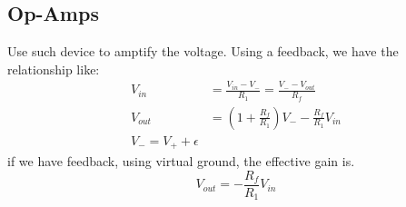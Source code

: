 \documentclass{article}
\begin{document}
\subsection{Op-Amps}
Use such device to amptify the voltage.
Using a feedback, we have the relationship like:
\begin{align*}
    V_{in} &= \frac{V_{in} - V_{-}}{R_1} = \frac{ V_{-} - V_{out}}{R_{f}} \\
    V_{out} &= (1 + \frac{R_{f}}{R_1})V_{-} - \frac{R_f}{R_1} V_{in} \\
    V_{-} = V_{+} + \epsilon
\end{align*}
if we have feedback, using virtual ground, the effective gain is.
$$ V_{out} = - \frac{R_f}{R_1} V_{in} $$
\end{document}
